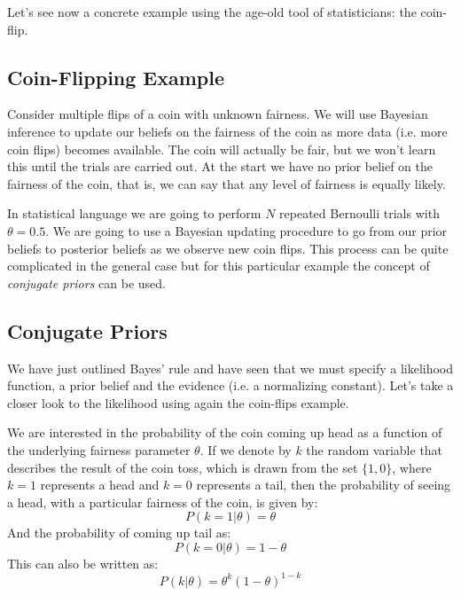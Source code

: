 Let's see now a concrete example using the age-old tool of statisticians: the coin-flip.

\subsection{Coin-Flipping Example}
Consider multiple flips of a coin with unknown fairness. We will use Bayesian inference to update our beliefs on the fairness of the coin as more data (i.e. more coin flips) becomes available. The coin will actually be fair, but we won't learn this until the trials are carried out. At the start we have no prior belief on the fairness of the coin, that is, we can say that any level of fairness is equally likely.

In statistical language we are going to perform $N$ repeated Bernoulli trials with $\theta=0.5$. %
We are going to use a Bayesian updating procedure to go from our prior beliefs to posterior beliefs as we observe new coin flips. 
This process can be quite complicated in the general case but for this particular example the concept of \emph{conjugate priors} can be used.

\subsection{Conjugate Priors}
We have just outlined Bayes' rule and have seen that we must specify a likelihood function, a prior belief and the evidence (i.e. a normalizing constant). Let's take a closer look to the likelihood using again the coin-flips example.

We are interested in the probability of the coin coming up head as a function of the underlying fairness parameter $\theta$.
If we denote by $k$ the random variable that describes the result of the coin toss, which is drawn from the set $\{1, 0\}$, where $k=1$ represents a head and $k=0$ represents a tail, then the probability of seeing a head, with a particular fairness of the coin, is given by:
\begin{equation}
  P(k=1|\theta) = \theta 
\end{equation}
And the probability of coming up tail as:
\begin{equation}
  P(k=0|\theta) = 1-\theta 
\end{equation}
This can also be written as:
\begin{equation}
  P(k|\theta) = \theta^k(1-\theta)^{1-k} 
\end{equation}

